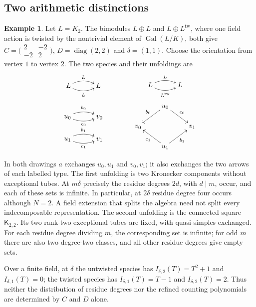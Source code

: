\documentclass[11pt, reqno]{amsart}
\numberwithin{equation}{section}
\theoremstyle{definition}
\newtheorem{example}[theorem]{Example}
\theoremstyle{remark}
\newcommand{\op}[1]{\operatorname{#1}}
\newcommand{\mr}[1]{\mathrm{#1}}
\newcommand{\Gal}{\op{Gal}}
\newcommand{\quiverdiagram}[1]{\vcenter{\hbox{$\displaystyle #1$}}}
\begin{document}
\subsection{Two arithmetic distinctions}
\begin{example}\label{ex:two-modulations}
Let $L=K_2$. The bimodules $L\oplus L$ and $L\oplus L^{\mr{tw}}$,
where one field action is twisted by the nontrivial element of
$\Gal(L/K)$, both give
$C=\bigl(\begin{smallmatrix}2&-2\\-2&2\end{smallmatrix}\bigr)$,
$D=\op{diag}(2,2)$ and $\delta=(1,1)$. Choose the
orientation from vertex $1$ to vertex $2$. The two species and their
unfoldings are
\[
\begin{array}{c@{\qquad\qquad}c}
\quiverdiagram{\xymatrix@C=3em{L\ar@/^0.6pc/[r]^{L}\ar@/_0.6pc/[r]_{L}&L}}
&\quiverdiagram{\xymatrix@C=3em{L\ar@/^0.6pc/[r]^{L}\ar@/_0.6pc/[r]_{L^{\mr{tw}}}&L}}\\[1.8em]
\quiverdiagram{\xymatrix@C=3em@R=2em{
u_0\ar@/^0.55pc/[r]^{b_0}\ar@/_0.55pc/[r]_{c_0}&v_0\\
u_1\ar@/^0.55pc/[r]^{b_1}\ar@/_0.55pc/[r]_{c_1}&v_1}}
&\quiverdiagram{\xymatrix@C=2.3em@R=1.7em{
 &u_0\ar[dl]_{b_0}\ar[dr]^{c_0}&\\
 v_0&&v_1\\
 &u_1\ar[ul]^{c_1}\ar[ur]_{b_1}&}}
\end{array}
\]

In both drawings $a$ exchanges $u_0,u_1$ and $v_0,v_1$; it also
exchanges the two arrows of each labelled type. The first unfolding
is two Kronecker components without exceptional
tubes. At $m\delta$ precisely the residue degrees $2d$, with $d\mid m$, occur, and each of these
sets is infinite.
In particular, at $2\delta$ residue degree four occurs although
$N=2$. A field extension that splits the algebra need not split
every indecomposable representation.
The second unfolding is the connected square $\mathsf K_{2,2}$.
Its two rank-two exceptional tubes are fixed, with quasi-simples
exchanged. For each residue degree dividing $m$, the corresponding set is infinite; for odd $m$ there
are also two degree-two classes, and all other residue degrees give empty sets.

Over a finite field, at $\delta$ the untwisted species has
$I_{\delta,2}(T)=T^2+1$ and $I_{\delta,1}(T)=0$; the twisted species
has $I_{\delta,1}(T)=T-1$ and $I_{\delta,2}(T)=2$.
Thus neither the distribution of residue degrees nor the
refined counting polynomials are determined by $C$ and $D$ alone.
\end{example}
\end{document}
